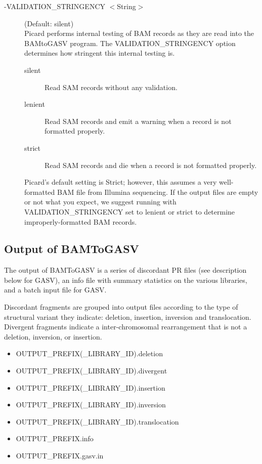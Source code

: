 \documentclass[11pt]{article}
\begin{document}
\begin{description}
\item[-VALIDATION\_STRINGENCY $<$String$>$] (Default: silent)\\
Picard performs internal testing of BAM records as they are read into the BAMtoGASV program.  The VALIDATION\_STRINGENCY option determines how stringent this internal testing is.  
\begin{description}
\item[silent] Read SAM records without any validation. 
\item[lenient] Read SAM records and emit a warning when a record is not formatted properly. 
\item[strict] Read SAM records and die when a record is not formatted properly.
\end{description}
Picard's default setting is Strict; however, this assumes a very well-formatted BAM file from Illumina sequencing.  If the output files are empty or not what you expect, we suggest running with VALIDATION\_STRINGENCY set to lenient or strict to determine improperly-formatted BAM records.
\end{description}
 
\subsection{Output of BAMToGASV}

The output of BAMToGASV is a series of discordant PR files (see description below for GASV), an info file with summary statistics on the various libraries, and a batch input file for GASV.  

Discordant fragments are grouped into output files according to the type of structural variant they indicate: deletion, insertion, inversion and translocation. Divergent fragments indicate a inter-chromosomal rearrangement that is not a deletion, inversion, or insertion.

\begin{itemize}
\item[] OUTPUT\_PREFIX(\_LIBRARY\_ID).deletion
\item[] OUTPUT\_PREFIX(\_LIBRARY\_ID).divergent
\item[] OUTPUT\_PREFIX(\_LIBRARY\_ID).insertion
\item[] OUTPUT\_PREFIX(\_LIBRARY\_ID).inversion
\item[] OUTPUT\_PREFIX(\_LIBRARY\_ID).translocation
\item[] OUTPUT\_PREFIX.info
\item[] OUTPUT\_PREFIX.gasv.in
\end{itemize}
\end{document}
